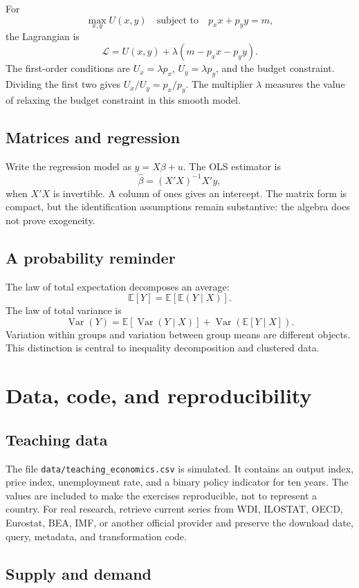 \documentclass[11pt,oneside,openany]{book}
\newcommand{\E}{\mathbb{E}}
\begin{document}
For
\[
\max_{x,y} U(x,y)\quad\text{subject to}\quad p_xx+p_yy=m,
\]
the Lagrangian is
\[
  \mathcal{L}=U(x,y)+\lambda(m-p_xx-p_yy).
\]
The first-order conditions are $U_x=\lambda p_x$, $U_y=\lambda p_y$, and the budget constraint. Dividing the first two gives $U_x/U_y=p_x/p_y$. The multiplier $\lambda$ measures the value of relaxing the budget constraint in this smooth model.

\section{Matrices and regression}

Write the regression model as $y=X\beta+u$. The OLS estimator is
\[
  \hat{\beta}=(X'X)^{-1}X'y,
\]
when $X'X$ is invertible. A column of ones gives an intercept. The matrix form is compact, but the identification assumptions remain substantive: the algebra does not prove exogeneity.

\section{A probability reminder}

The law of total expectation decomposes an average:
\[
  \E[Y]=\E[\E(Y\mid X)].
\]
The law of total variance is
\[
  \operatorname{Var}(Y)=\E[\operatorname{Var}(Y\mid X)]+\operatorname{Var}(\E[Y\mid X]).
\]
Variation within groups and variation between group means are different objects. This distinction is central to inequality decomposition and clustered data.

\chapter{Data, code, and reproducibility}
\label{app:code}

\section{Teaching data}

The file \texttt{data/teaching\_economics.csv} is simulated. It contains an output index, price index, unemployment rate, and a binary policy indicator for ten years. The values are included to make the exercises reproducible, not to represent a country. For real research, retrieve current series from WDI, ILOSTAT, OECD, Eurostat, BEA, IMF, or another official provider and preserve the download date, query, metadata, and transformation code.

\section{Supply and demand}
\end{document}
